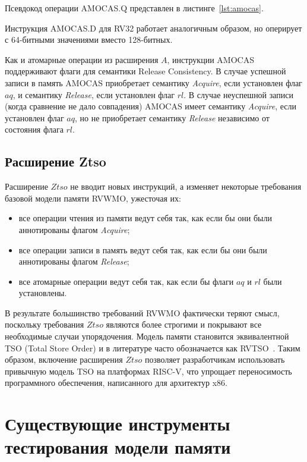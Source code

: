 Псевдокод операции AMOCAS.Q представлен в листинге~\ref{lst:amocas}.

\begin{minipage}{\textwidth}
  \centering
  
\end{minipage}

Инструкция AMOCAS.D для RV32 работает аналогичным образом, но
оперирует с 64-битными значениями вместо 128-битных.

Как и атомарные операции из расширения $A$, инструкции AMOCAS
поддерживают флаги для семантики Release Consistency. В случае
успешной записи в память AMOCAS приобретает семантику
\textit{Acquire}, если установлен флаг $aq$, и семантику
\textit{Release}, если установлен флаг $rl$. В случае неуспешной
записи (когда сравнение не дало совпадения) AMOCAS имеет семантику
\textit{Acquire}, если установлен флаг $aq$, но не приобретает
семантику \textit{Release} независимо от состояния флага $rl$.

\subsection{Расширение Ztso}

Расширение $Ztso$ не вводит новых инструкций, а изменяет некоторые
требования базовой модели памяти RVWMO, ужесточая их:
\begin{itemize}
  \item все операции чтения из памяти ведут себя так, как если бы они
    были аннотированы флагом \textit{Acquire};
  \item все операции записи в память ведут себя так, как если бы они
    были аннотированы флагом \textit{Release};
  \item все атомарные операции ведут себя так, как если бы флаги $aq$
    и $rl$ были установлены.
\end{itemize}

В результате большинство требований RVWMO фактически теряют смысл,
поскольку требования $Ztso$ являются более строгими и покрывают все
необходимые случаи упорядочения. Модель памяти становится
эквивалентной TSO (Total Store Order) и в литературе часто
обозначается как RVTSO~\cite{ztso}. Таким образом, включение
расширения $Ztso$ позволяет разработчикам использовать привычную
модель TSO на платформах RISC-V, что упрощает переносимость
программного обеспечения, написанного для архитектур x86.

\section{Существующие инструменты тестирования модели памяти}
\label{sec:ch1/solutions}

